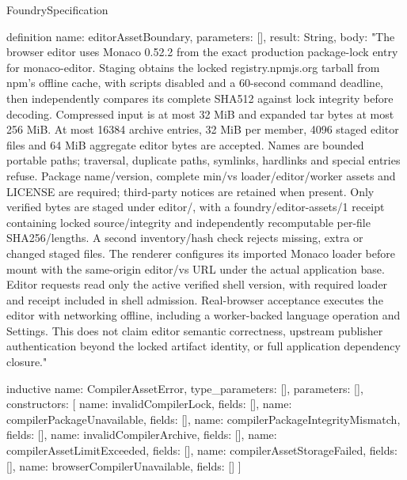 \begin{lexlean}{FoundrySpecification}
\begin{semanticmodule}
definition{
  name: editorAssetBoundary,
  parameters: [],
  result: String,
  body: "The browser editor uses Monaco 0.52.2 from the exact production package-lock entry for monaco-editor. Staging obtains the locked registry.npmjs.org tarball from npm's offline cache, with scripts disabled and a 60-second command deadline, then independently compares its complete SHA512 against lock integrity before decoding. Compressed input is at most 32 MiB and expanded tar bytes at most 256 MiB. At most 16384 archive entries, 32 MiB per member, 4096 staged editor files and 64 MiB aggregate editor bytes are accepted. Names are bounded portable paths; traversal, duplicate paths, symlinks, hardlinks and special entries refuse. Package name/version, complete min/vs loader/editor/worker assets and LICENSE are required; third-party notices are retained when present. Only verified bytes are staged under editor/, with a foundry/editor-assets/1 receipt containing locked source/integrity and independently recomputable per-file SHA256/lengths. A second inventory/hash check rejects missing, extra or changed staged files. The renderer configures its imported Monaco loader before mount with the same-origin editor/vs URL under the actual application base. Editor requests read only the active verified shell version, with required loader and receipt included in shell admission. Real-browser acceptance executes the editor with networking offline, including a worker-backed language operation and Settings. This does not claim editor semantic correctness, upstream publisher authentication beyond the locked artifact identity, or full application dependency closure."
}

inductive{
  name: CompilerAssetError,
  type_parameters: [],
  parameters: [],
  constructors: [
    {name: invalidCompilerLock, fields: []},
    {name: compilerPackageUnavailable, fields: []},
    {name: compilerPackageIntegrityMismatch, fields: []},
    {name: invalidCompilerArchive, fields: []},
    {name: compilerAssetLimitExceeded, fields: []},
    {name: compilerAssetStorageFailed, fields: []},
    {name: browserCompilerUnavailable, fields: []}
  ]
}


\end{semanticmodule}
\end{lexlean}
